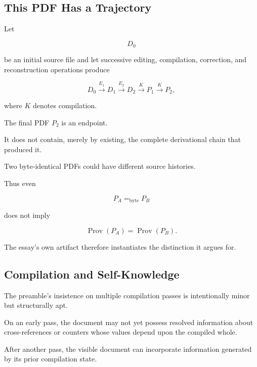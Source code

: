 \documentclass[
  11pt,
  a4paper,
  DIV=12,
  BCOR=0mm,
  parskip=half-
]{scrartcl}
\newcommand{\eqbyte}{=_{\mathrm{byte}}}
\newcommand{\Prov}{\operatorname{Prov}}
\theoremstyle{definition}
\theoremstyle{plain}
\theoremstyle{remark}
\begin{document}

\subsection{This PDF Has a Trajectory}
\label{app:document-trajectory}

Let

\[
  D_0
\]

be an initial source file and let successive editing, compilation, correction,
and reconstruction operations produce

\[
  D_0
  \xrightarrow{E_1}
  D_1
  \xrightarrow{E_2}
  D_2
  \xrightarrow{K}
  P_1
  \xrightarrow{K}
  P_2,
\]

where \(K\) denotes compilation.

The final PDF \(P_2\) is an endpoint.

It does not contain, merely by existing, the complete derivational chain that
produced it.

Two byte-identical PDFs could have different source histories.

Thus even

\[
  P_A\eqbyte P_B
\]

does not imply

\[
  \Prov(P_A)=\Prov(P_B).
\]

The essay's own artifact therefore instantiates the distinction it argues for.


\subsection{Compilation and Self-Knowledge}
\label{app:two-pass}

The preamble's insistence on multiple compilation passes is intentionally
minor but structurally apt.

On an early pass, the document may not yet possess resolved information about
cross-references or counters whose values depend upon the compiled whole.

After another pass, the visible document can incorporate information generated
by its prior compilation state.
\end{document}
